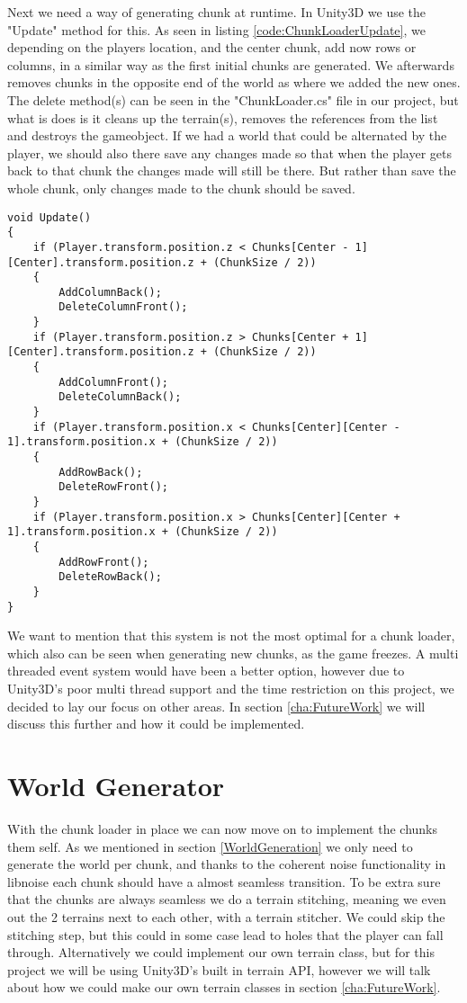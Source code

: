 Next we need a way of generating chunk at runtime. In Unity3D we use the "Update" method for this. As seen in listing \ref{code:ChunkLoaderUpdate}, we depending on the players location, and the center chunk, add now rows or columns, in a similar way as the first initial chunks are generated. We afterwards removes chunks in the opposite end of the world as where we added the new ones. The delete method(s) can be seen in the "ChunkLoader.cs" file in our project, but what is does is it cleans up the terrain(s), removes the references from the list and destroys the gameobject. If we had a world that could be alternated by the player, we should also there save any changes made so that when the player gets back to that chunk the changes made will still be there. But rather than save the whole chunk, only changes made to the chunk should be saved.

\begin{lstlisting}[caption = The Update() method used to generate new chunks., label=code:ChunkLoaderUpdate, language=Csharp]
void Update()
{
	if (Player.transform.position.z < Chunks[Center - 1][Center].transform.position.z + (ChunkSize / 2))
	{
		AddColumnBack();
		DeleteColumnFront();
	}
	if (Player.transform.position.z > Chunks[Center + 1][Center].transform.position.z + (ChunkSize / 2))
	{
		AddColumnFront();
		DeleteColumnBack();
	}
	if (Player.transform.position.x < Chunks[Center][Center - 1].transform.position.x + (ChunkSize / 2))
	{
		AddRowBack();
		DeleteRowFront();
	}
	if (Player.transform.position.x > Chunks[Center][Center + 1].transform.position.x + (ChunkSize / 2))
	{
		AddRowFront();
		DeleteRowBack();
	}
}
\end{lstlisting}

We want to mention that this system is not the most optimal for a chunk loader, which also can be seen when generating new chunks, as the game freezes. A multi threaded event system would have been a better option, however due to Unity3D's poor multi thread support and the time restriction on this project, we decided to lay our focus on other areas. In section \ref{cha:FutureWork} we will discuss this further and how it could be implemented.


\section{World Generator}
\label{WorldGenerator}

With the chunk loader in place we can now move on to implement the chunks them self. As we mentioned in section \ref{WorldGeneration} we only need to generate the world per chunk, and thanks to the coherent noise functionality in libnoise each chunk should have a almost seamless transition. To be extra sure that the chunks are always seamless we do a terrain stitching, meaning we even out the 2 terrains next to each other, with a terrain stitcher. We could skip the stitching step, but this could in some case lead to holes that the player can fall through. Alternatively we could implement our own terrain class, but for this project we will be using Unity3D's built in terrain API, however we will talk about how we could make our own terrain classes in section \ref{cha:FutureWork}.

